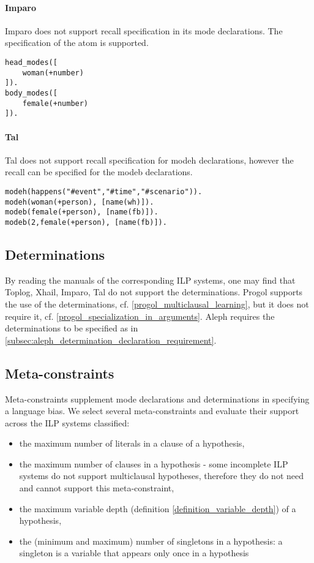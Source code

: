 \paragraph{Imparo}\cite{kimber2013imparo}
Imparo does not support recall specification in its mode declarations. The specification of the atom is supported.
\begin{exmp}
\begin{lstlisting}
head_modes([
    woman(+number)
]).
body_modes([
    female(+number)
]).
\end{lstlisting}
\end{exmp}

\paragraph{Tal}
Tal does not support recall specification for modeh declarations, however the recall can be specified for the modeb declarations\cite{corapi2011tal}.
\begin{exmp}
\begin{lstlisting}
modeh(happens("#event","#time","#scenario")).
modeh(woman(+person), [name(wh)]).
modeb(female(+person), [name(fb)]).
modeb(2,female(+person), [name(fb)]).
\end{lstlisting}
\end{exmp}

\subsection{Determinations}\label{classification_determinations}
By reading the manuals of the corresponding ILP systems, one may find that
Toplog, Xhail, Imparo, Tal do not support the determinations.
Progol supports the use of the determinations, cf. \ref{progol_multiclausal_learning}, but it does not require it, cf. \ref{progol_specialization_in_arguments}.
Aleph requires the determinations to be specified as in \ref{subsec:aleph_determination_declaration_requirement}.

\subsection{Meta-constraints}\label{classification_meta-constraints}
Meta-constraints supplement mode declarations and determinations in specifying a language bias. We select several meta-constraints and evaluate their support  across the ILP systems classified:

\begin{itemize}
\item the maximum number of literals in a clause of a hypothesis,
\item the maximum number of clauses in a hypothesis - some incomplete ILP systems do not support multiclausal hypotheses, therefore they do not need and cannot support this meta-constraint,
\item the maximum variable depth (definition \ref{definition_variable_depth}) of a hypothesis,
\item the (minimum and maximum) number of singletons in a hypothesis:
a singleton is a variable that appears only once in a hypothesis\cite{santos2008toplogWebsite}
\end{itemize}

